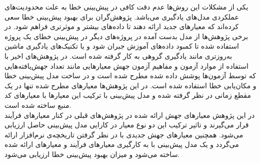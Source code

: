   یکی از مشکلات این روش‌ها عدم دقت کافی در پیش‌بینی خطا به علت محدودیت‌های عملکردی مدل‌های یادگیری می‌باشد. پژوهش‌گران برای بهبود پیش‌بینی خطا سعی کرده‌اند که معیارهای جدید ارائه دهند تا داده‌های بیشتر و موثرتری فراهم شود. در برخی پژوهش‌ها از مدل بدست آمده در پروژه‌های دیگر در پیش‌بینی خطای یک پروژه استفاده شده تا کمبود داده‌های آموزش جبران شود و یا تکنیک‌های یادگیری ماشین به‌روزتری مانند یادگیری گروهی به کار گرفته شده است. در پژوهش‌های اخیر  با استفاده از موارد آزمون و مفاهیم آزمون جهش معیارهایی مانند تعداد جهش‌یافته‌هایی که توسط آزمون‌ها پوشش داده شده مطرح  شده است و در ساخت مدل پیش‌بینی خطا \cite{bowes2016mutation} و مکان‌یابی خطا  \cite {papadakis2015metallaxis}استفاده شده است. در این پژوهش‌ها معیارهای مطرح شده تنها در یک مقطع زمانی در نظر گرفته شده و مدل پیش‌بینی با ترکیب این معیارها با معیارهای کد منبع ساخته شده است.\\
  
 در این پژوهش معیارهای جهش ارائه شده در پژوهش‌های قبلی در کنار معیارهای فرآیند قرار می‌گیرند و تاثیر ترکیب این دو نوع  معیار در کارایی مدل پیش‌بینی حاصل ارزیابی می‌شود. همچنین معیارهای جهش جدیدی با در نظر گرفتن تاریخچه‌ی ‌نرم‌افزار ارائه می‌گردد و یک مدل پیش‌بینی با به کارگیری معیارهای فرآیند و معیارهای ارائه شده ساخته می‌شود و میزان بهبود پیش‌بینی خطا ارزیابی می‌شود.  
